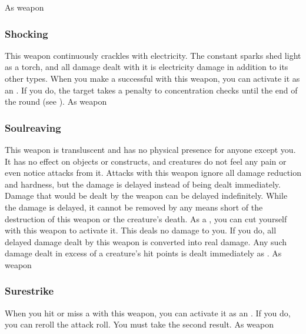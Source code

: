  
 As weapon
\lowercase{\hypertarget{item:Shocking}{}}\label{item:Shocking}
\hypertarget{item:Shocking}{\subsubsection{Shocking\hfill{}}}
This weapon continuously crackles with electricity.
The constant sparks shed light as a torch, and all damage dealt with it is electricity damage in addition to its other types.
When you make a successful  with this weapon, you can activate it as an .
If you do, the target takes a  penalty to concentration checks until the end of the round (see ).
 
 As weapon
\lowercase{\hypertarget{item:Soulreaving}{}}\label{item:Soulreaving}
\hypertarget{item:Soulreaving}{\subsubsection{Soulreaving\hfill{}}}
This weapon is transluscent and has no physical presence for anyone except you.
It has no effect on objects or constructs, and creatures do not feel any pain or even notice attacks from it.
Attacks with this weapon ignore all damage reduction and hardness, but the damage is delayed instead of being dealt immediately.
Damage that would be dealt by the weapon can be delayed indefinitely.
While the damage is delayed, it cannot be removed by any means short of the destruction of this weapon or the creature's death.
As a , you can cut yourself with this weapon to activate it.
This deals no damage to you.
If you do, all delayed damage dealt by this weapon is converted into real damage.
Any such damage dealt in excess of a creature's hit points is dealt immediately as .
 As weapon
\lowercase{\hypertarget{item:Surestrike}{}}\label{item:Surestrike}
\hypertarget{item:Surestrike}{\subsubsection{Surestrike\hfill{}}}
When you hit or miss a  with this weapon, you can activate it as an .
If you do, you can reroll the attack roll.
You must take the second result.
 
 As weapon
\lowercase{\hypertarget{item:Thieving}{}}\label{item:Thieving}
